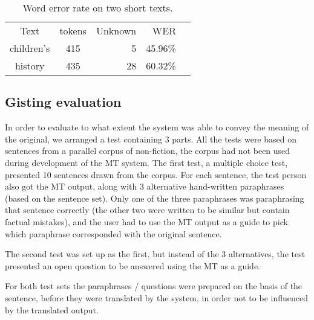 \documentclass{book}
\begin{document}
\begin{table}
  \begin{center}
  \begin{tabular}{ccrrr}
   Text       & tokens & Unknown & WER  \\
   children's & 415     & 5      & 45.96\% \\
   history    & 435     & 28     & 60.32\%  \\
  \end{tabular}
    \caption{Word error rate on two short texts.}
    \label{table:wer}
  \end{center}
\end{table}


\subsection{Gisting evaluation}
  
In order to evaluate to what extent the system was able to convey the
meaning of the original, we arranged a test containing 3 parts. All
the tests were based on sentences from a parallel corpus of
non-fiction, the corpus had not been used during development of the MT
system. The first test, a multiple choice test, presented 10 \sme{}
sentences drawn from the corpus. For each sentence, the test person
also got the MT output, along with 3 alternative hand-written \nob{}
paraphrases (based on the \sme{} sentence set). Only one of the three
paraphrases was paraphrasing that \sme{} sentence correctly (the other
two were written to be similar but contain factual mistakes), and the
user had to use the MT output as a guide to pick which paraphrase
corresponded with the original \sme{} sentence.

The second test was set up as the first, but instead of the 3
alternatives, the test presented an open question to be answered using
the MT as a guide.

For both test sets the paraphrases / questions were prepared on the
basis of the \sme{} sentence, before they were translated by the
system, in order not to be influenced by the translated output.


\end{document}
